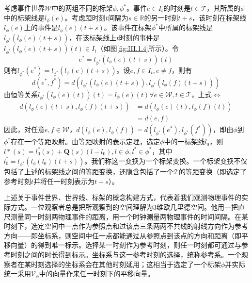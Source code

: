 \documentclass[main.tex]{subfiles}
\begin{document}
考虑事件世界$\mathcal{W}$中的两组不同的标架$\phi,\phi^*$。事件$e\in I_t$的时刻是$t\in\mathcal{T}$，其所属的$\phi$中的标架线是$l_\phi\left(e\right)$。考虑距时刻$t$间隔为$s\in\mathbb{R}$的另一时刻$t+s$，该时刻在标架线$l_\phi\left(e\right)$上的事件是$l_\phi\left(e\right)\left(t+s\right)$。该事件在标架$\phi^*$中所属的标架线是$l_{\phi^*}\left(l_\phi\left(e\right)\left(t+s\right)\right)$，在该标架线上$t$时刻的事件是$l_{\phi^*}\left(l_\phi\left(e\right)\left(t+s\right)\right)\left(t\right)\in I_t$（如图\ref{fig:III.1.4}所示）。令
\[e^*=l_{\phi^*}\left(l_\phi\left(e\right)\left(t+s\right)\right)\left(t\right)\]
则有$l_{\phi^*}\left(e^*\right)=l_{\phi^*}\left(l_\phi\left(e\right)\left(t+s\right)\right)$。设$e,f\in I_t,e\neq f$，则有
\[
    d\left(e^*,f^*\right)=d\left(l_{\phi^*}\left(l_\phi\left(e\right)\left(t+s\right)\right),l_{\phi^*}\left(l_\phi\left(f\right)\left(t+s\right)\right)\right)
\]
由恒等关系$l_{\phi^*}\left(l_\phi\left(e\right)\left(t\right)\right)\left(t\right)=l_\phi\left(e\right)\left(t\right)\forall e\in\mathcal{W},t\in\mathcal{T}$，上式$\Leftrightarrow$
\begin{align*}
    d\left(l_\phi\left(e\right)\left(t+s\right),l_\phi\left(f\right)\left(t+s\right)\right)&=d\left(l_\phi\left(e\right)\left(t\right),l_\phi\left(f\right)\left(t\right)\right)\\
    &=d\left(e,f\right)
\end{align*}
因此，对任意$e,f\in\mathcal{W}$，$d\left(l_\phi\left(e\right),l_\phi\left(f\right)\right)=d\left(l_{\phi^*}\left(e^*\right),l_{\phi^*}\left(f^*\right)\right)$，即由$\phi$到$\phi^*$存在一个等距映射。由等距映射的表示定理，选定$\phi$中的一标架线$l_0$，则$l*\left(s\right)=l_0^*\left(s\right)+\mathbf{Q}\left(s\right)\left(l-l_0\right),l\in\phi,l^*\in\phi^*$，其中$l_0^*=l_{\phi^*}\left(l_\phi\left(l_0\right)\left(t+s\right)\right)$。我们称这一变换为一个标架变换。一个标架变换不仅包括了上述的标架线之间的等距变换，还隐含包括了一个$\mathcal{T}$的等距变换（即选定了参考时刻$t$并将任一时刻表示为$t+s$）。

上述关于事件世界、世界线、标架的概念构建方式，代表着我们观测物理事件的实际方式。一位观察者总是把所观察到的空间理解为3维欧几里德空间。他用一把直尺测量同一时刻两物理事件的距离，用一个时钟测量两物理事件的时间间隔。在某时刻下，选定空间中一点作为参照点和过该点三条两两不共线的射线方向作为参考方向——即坐标系，则空间中任一点都能通过从参照点到该点的方向和距离（即平移向量）的得到唯一标示。选择某一时刻作为参考时刻，则任一时刻都可通过与参考时刻之间的时长得到标示。坐标系与这一参考时刻的选择，统称参考系。一个观察者在某时刻选择的坐标系会在其他时刻延用；这相当于选定了一个标架$\phi$并实际统一采用$\mathcal{V}_\phi$中的向量作来任一时刻下的平移向量。
\end{document}
